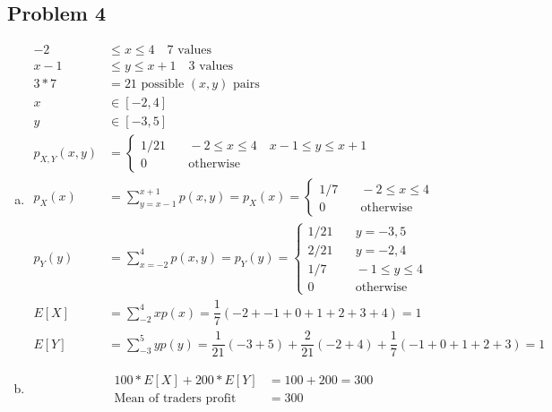 \documentclass{article}
\begin{document}
\begin{flushleft}
\section*{Problem 4}
\begin{enumerate}[(a)]
\item
\begin{align*}
-2&\leq x \leq 4 \quad \text{7 values}\\
x-1&\leq y \leq x+1 \quad \text{3 values}\\
3*7&=21 \text{ possible } (x,y) \text{ pairs}\\
x&\in [-2,4]\\
y&\in [-3,5]\\
p_{X,Y}(x,y)&=\begin{cases}
1/21 &\quad -2\leq x\leq 4 \quad x-1\leq y\leq x+1\\
0 &\quad \text{otherwise}
\end{cases}\\
p_X(x)&=\sum_{y=x-1}^{x+1}p(x,y)=p_X(x)=\begin{cases}
1/7 &\quad -2\leq x \leq 4\\
0 &\quad \text{otherwise}
\end{cases}\\
p_Y(y)&=\sum_{x=-2}^{4}p(x,y)=p_Y(y)=\begin{cases}
1/21 &\quad y=-3,5\\
2/21 &\quad y=-2,4\\
1/7 &\quad -1\leq y \leq 4\\
0 &\quad \text{otherwise}
\end{cases}\\
E[X]&=\sum_{-2}^{4}xp(x)=\dfrac{1}{7}(-2+-1+0+1+2+3+4)=1\\
E[Y]&=\sum_{-3}^{5}yp(y)=\dfrac{1}{21}(-3+5)+\dfrac{2}{21}(-2+4)+\dfrac{1}{7}(-1+0+1+2+3)=1
\end{align*}
\item 
\begin{align*}
100*E[X]+200*E[Y]&=100+200=300\\
\text{Mean of traders profit }&= 300
\end{align*}
\end{enumerate}

\end{flushleft}
\end{document}
